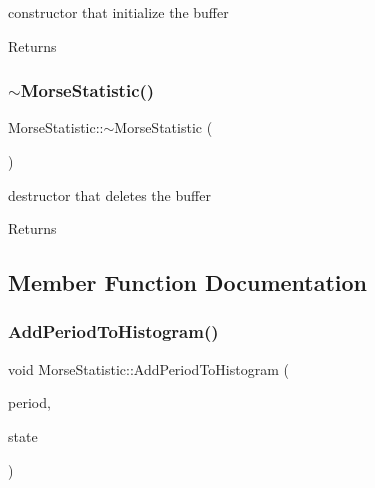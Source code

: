 constructor that initialize the buffer 

\begin{DoxyReturn}{Returns}

\end{DoxyReturn}
\mbox{\label{classMorseStatistic_a9eb933dcacfbc2e124208f901faba46d}} 
\subsubsection{\texorpdfstring{$\sim$\+Morse\+Statistic()}{~MorseStatistic()}}
{\footnotesize\ttfamily Morse\+Statistic\+::$\sim$\+Morse\+Statistic (\begin{DoxyParamCaption}{ }\end{DoxyParamCaption})\hspace{0.3cm}{\ttfamily [virtual]}}



destructor that deletes the buffer 

\begin{DoxyReturn}{Returns}

\end{DoxyReturn}


\subsection{Member Function Documentation}
\mbox{\label{classMorseStatistic_addefc50d54ca28297ad4ebb50488601d}} 
\subsubsection{\texorpdfstring{Add\+Period\+To\+Histogram()}{AddPeriodToHistogram()}}
{\footnotesize\ttfamily void Morse\+Statistic\+::\+Add\+Period\+To\+Histogram (\begin{DoxyParamCaption}\item[{double}]{period,  }\item[{Morse\+::\+Edge\+State}]{state }\end{DoxyParamCaption})}



